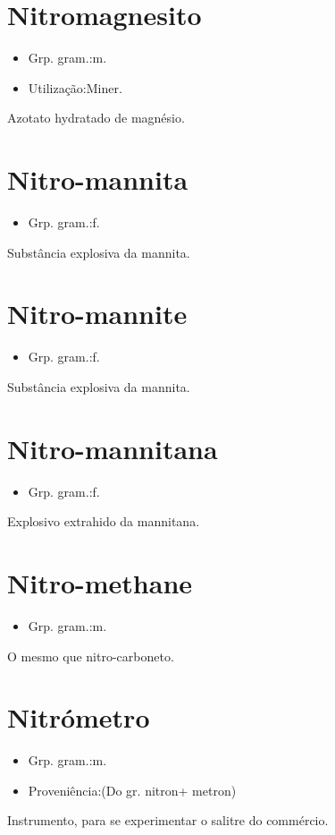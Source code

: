 \section{Nitromagnesito}
\begin{itemize}
\item {Grp. gram.:m.}
\end{itemize}
\begin{itemize}
\item {Utilização:Miner.}
\end{itemize}
Azotato hydratado de magnésio.
\section{Nitro-mannita}
\begin{itemize}
\item {Grp. gram.:f.}
\end{itemize}
Substância explosiva da mannita.
\section{Nitro-mannite}
\begin{itemize}
\item {Grp. gram.:f.}
\end{itemize}
Substância explosiva da mannita.
\section{Nitro-mannitana}
\begin{itemize}
\item {Grp. gram.:f.}
\end{itemize}
Explosivo extrahido da mannitana.
\section{Nitro-methane}
\begin{itemize}
\item {Grp. gram.:m.}
\end{itemize}
O mesmo que nitro-carboneto.
\section{Nitrómetro}
\begin{itemize}
\item {Grp. gram.:m.}
\end{itemize}
\begin{itemize}
\item {Proveniência:(Do gr. \textunderscore nitron\textunderscore  + \textunderscore metron\textunderscore )}
\end{itemize}
Instrumento, para se experimentar o salitre do commércio.

